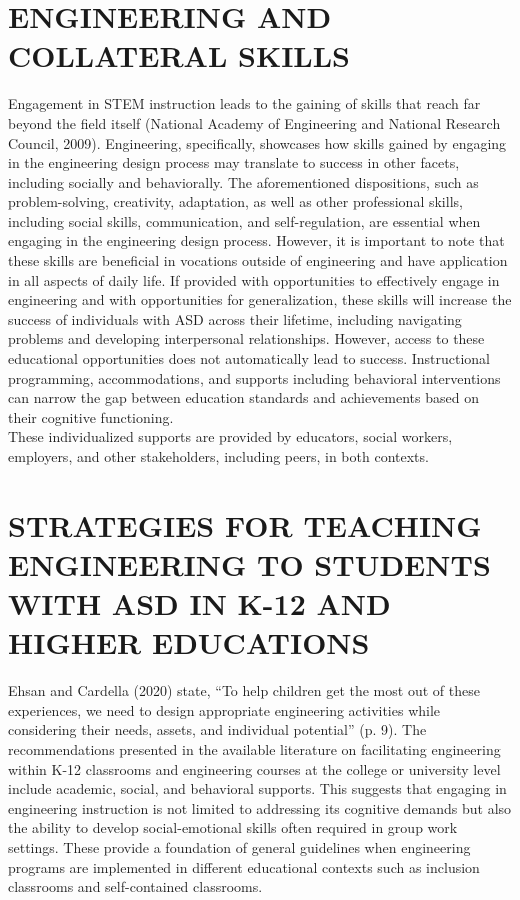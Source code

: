 \documentclass[11.5pt]{sig-alternate}
\begin{document}
\begin{large}
\section*{ENGINEERING AND COLLATERAL SKILLS}

Engagement in STEM instruction leads to the gaining of skills that reach far beyond the field itself (National Academy of Engineering and National Research Council, 2009). Engineering, specifically, showcases how skills gained by engaging in the engineering design process may translate to success in other facets, including socially and behaviorally. The aforementioned dispositions, such as problem-solving, creativity, adaptation, as well as other professional skills, including social skills, communication, and self-regulation, are essential when engaging in the engineering design process. However, it is important to note that these skills are beneficial in vocations outside of engineering and have application in all aspects of daily life. If provided with opportunities to effectively engage in engineering and with opportunities for generalization, these skills will increase the success of individuals with ASD across their lifetime, including navigating problems and developing interpersonal relationships. However, access to these educational opportunities does not automatically lead to success. Instructional programming, accommodations, and supports including behavioral interventions can narrow the gap between education standards and achievements based on their cognitive functioning. \\These individualized supports are provided by educators, social workers, employers, and other stakeholders, including peers, in both contexts. 

\section*{STRATEGIES FOR TEACHING ENGINEERING TO STUDENTS WITH ASD IN K-12 AND HIGHER EDUCATIONS}

Ehsan and Cardella (2020) state, “To help children get the most out of these experiences, we need to design appropriate engineering activities while considering their needs, assets, and individual potential” (p. 9). The recommendations presented in the available literature on facilitating engineering within K-12 classrooms and engineering courses at the college or university level include academic, social, and behavioral supports. This suggests that engaging in engineering instruction is not limited to addressing its cognitive demands but also the ability to develop social-emotional skills often required in group work settings. These provide a foundation of general guidelines when engineering programs are implemented in different educational contexts such as inclusion classrooms and self-contained classrooms.


\end{large}
\end{document}
